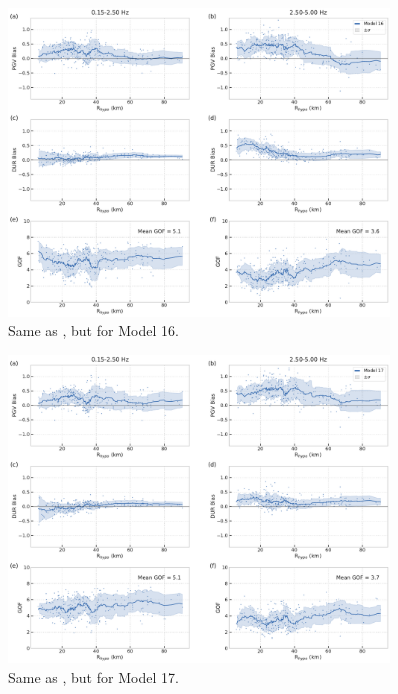 \begin{figure}[!ht]
  \centering
  \includegraphics[width=0.9\textwidth,height=0.9\textheight,keepaspectratio]{figures/figure_highf_S26.pdf}
  \caption{Same as , but for Model 16.
  }
\label{fig:highf-S26}
\end{figure}
\clearpage


\begin{figure}[!ht]
  \centering
  \includegraphics[width=0.9\textwidth,height=0.9\textheight,keepaspectratio]{figures/figure_highf_S27.pdf}
  \caption{Same as , but for Model 17.
  }
\label{fig:highf-S27}
\end{figure}
\clearpage


